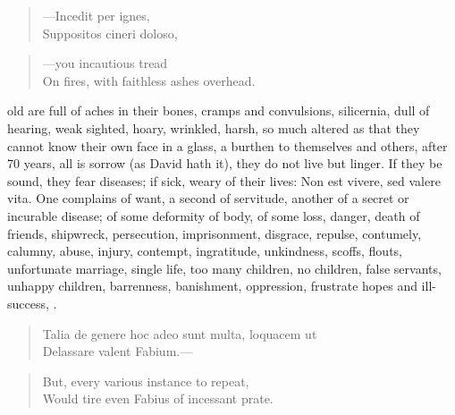 {\begin{verse}
---\textlatin{Incedit per ignes},\\
\textlatin{Suppositos cineri doloso},
\end{verse}

\begin{verse}
---you incautious tread\\
On fires, with faithless ashes overhead.
\end{verse}

old are full of aches in their bones, cramps and convulsions,
silicernia, dull of hearing, weak sighted, hoary, wrinkled, harsh, so
much altered as that they cannot know their own face in a glass, a
burthen to themselves and others, after 70 years, all is sorrow (as
David hath it), they do not live but linger. If they be sound, they
fear diseases; if sick, weary of their lives: Non est vivere, sed
valere vita. One complains of want, a second of servitude,
another of a secret or incurable disease; of some deformity of
body, of some loss, danger, death of friends, shipwreck, persecution,
imprisonment, disgrace, repulse,  contumely, calumny, abuse,
injury, contempt, ingratitude, unkindness, scoffs, flouts, unfortunate
marriage, single life, too many children, no children, false servants,
unhappy children, barrenness, banishment, oppression, frustrate hopes
and ill-success, \etc{}.

\begin{verse}
\textlatin{Talia de genere hoc adeo sunt multa, loquacem ut}\\
\textlatin{Delassare valent Fabium}.---
\end{verse}

\begin{verse}
But, every various instance to repeat,\\
Would tire even Fabius of incessant prate.
\end{verse}

}
